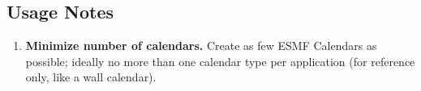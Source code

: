 
\subsection{Usage Notes}
\begin{enumerate}

\item {\bf Minimize number of calendars.}  Create as few ESMF Calendars as 
possible; ideally no more than one calendar type per application (for 
reference only, like a wall calendar).  
\end{enumerate}